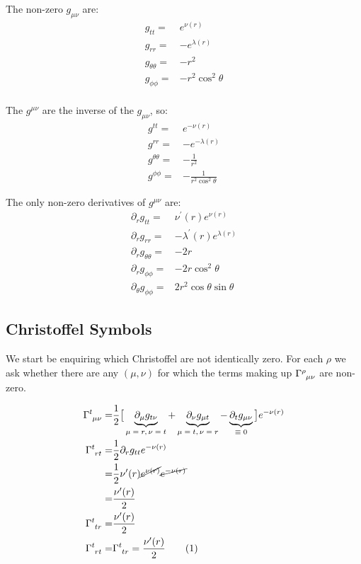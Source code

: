 \documentclass[]{article}
\newcommand\numberthis{\addtocounter{equation}{1}\tag{\theequation}}
\begin{document}
The  non-zero $g_{\mu\nu}$ are:
\begin{align*}
	g_{tt}=& e^{\nu(r)}\\
	g_{rr}=&-e^{\lambda(r)}\\
	g_{\theta\theta}=&-r^2\\
	g_{\phi\phi}=&-r^2 \cos^2 \theta\\
\end{align*}

The $g^{\mu\nu}$ are the inverse of the $g_{\mu\nu}$, so: 
\begin{align*}
	g^{tt}=& e^{-\nu(r)}\\
	g^{rr}=&-e^{-\lambda(r)}\\
	g^{\theta\theta}=&-\frac{1}{r^2}\\
	g^{\phi\phi}=&-\frac{1}{r^2 \cos^2 \theta}
\end{align*}

The only non-zero derivatives of $g^{\mu\nu}$ are:
\begin{align*}
	\partial_r g_{tt}=& \nu^\prime(r) e^{\nu(r)}\\
	\partial_r g_{rr}=& -\lambda^\prime(r) e^{\lambda(r)}\\
	\partial_r g_{\theta\theta}=& -2 r\\
	\partial_r g_{\phi\phi}=& -2 r \cos^2 \theta\\
	\partial_\theta g_{\phi\phi}=& 2 r^2 \cos \theta \sin \theta
\end{align*}

\subsection{Christoffel Symbols}

We start be enquiring which Christoffel are not identically zero. For each $\rho$ we ask whether there are any $(\mu,\nu)$ for which the terms making up $\Gamma\indices{^\rho_{\mu\nu}}$ are non-zero.

\begin{align*}
	\Gamma\indices{^t_{\mu\nu}} =&\frac{1}{2} \big[\underbrace{ \partial_\mu g_{t\nu}}_\text{$\mu=r,\nu=t$} + \underbrace{\partial_\nu g_{\mu t}}_\text{$\mu=t,\nu=r$} - \underbrace{\partial_t g_{\mu\nu}}_\text{$\equiv0$}\big] e^{-\nu(r)}\\
	\Gamma\indices{^t_{rt}}=&\frac{1}{2} \partial_r g_{tt}  e^{-\nu(r)}\\
	=&\frac{1}{2}\nu^\prime(r) \cancel{e^{\nu(r)}}\cancel{e^{-\nu(r)}}\\
	=&\frac{\nu^\prime(r)}{2}\\
	\Gamma\indices{^t_{tr}}=&\frac{\nu^\prime(r)}{2}\\
	\Gamma\indices{^t_{rt}}=&\Gamma\indices{^t_{tr}}=\frac{\nu^\prime(r)}{2} \numberthis \label{eq:Gamma:ttr}
\end{align*}
\end{document}
